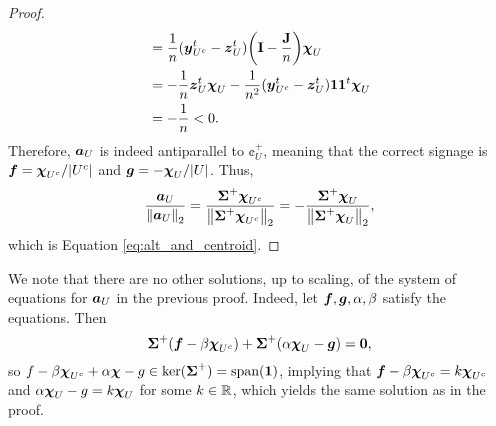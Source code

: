 \begin{proof}
\begin{align*}
&= \frac{1}{n}(\vb*{y}_{U^c}^t-\vb*{z}_U^t)\bigg(\vb{I}-\frac{\vb{J}}{n}\bigg)\boldsymbol{\chi}_U\\ &=-\frac{1}{n}\vb*{z}_U^t\boldsymbol{\chi}_U  - \frac{1}{n^2}(\vb*{y}_{U^c}^t-\vb*{z}_U^t)\vb{1}\vb{1}^t\boldsymbol{\chi}_U\\
&= -\frac{1}{n}<0.
\end{align*}
Therefore, $\vb*{a}_U$ is indeed antiparallel to $\cent^+_U$, meaning that the correct signage is $\vb*{f}=\boldsymbol{\chi}_{U^c}/|U^c|$ and $\vb*{g}=-\boldsymbol{\chi}_U/|U|$. Thus, 
\begin{equation*}
\frac{\vb*{a}_U}{\norm{\vb*{a}_U}_2}=\frac{\boldsymbol{\Sigma}^+\boldsymbol{\chi}_{U^c}}{\norm{ \boldsymbol{\Sigma}^+\boldsymbol{\chi}_{U^c}}_2}=-\frac{\boldsymbol{\Sigma}^+\boldsymbol{\chi}_{U}}{\norm{\boldsymbol{\Sigma}^+\boldsymbol{\chi}_U}_2},
\end{equation*}
which is Equation \eqref{eq:alt_and_centroid}. 
\end{proof}

\begin{remark}
	We note that there are no other solutions, up to scaling, of the system of equations for $\vb*{a}_U$ in the previous proof. Indeed, let $\vb*{f},\vb*{g},\alpha,\beta$ satisfy the equations. 
	Then 
	\[\boldsymbol{\Sigma}^+(\vb*{f}-\beta\boldsymbol{\chi}_{U^c}) + \boldsymbol{\Sigma}^+(\alpha\boldsymbol{\chi}_U-\vb*{g})=\vb{0}, \]
	so $f-\beta\boldsymbol{\chi}_{U^c} + \alpha\boldsymbol{\chi} -g\in \ker(\boldsymbol{\Sigma}^+) = \textnormal{span}(\vb{1})$, implying that $\vb*{f}-\beta\boldsymbol{\chi}_{U^c} = k\boldsymbol{\chi}_{U^c}$ and $\alpha\boldsymbol{\chi}_U -g=k\boldsymbol{\chi}_{U}$ for some $k\in \mathbb{R}$, which yields the same solution as in the proof. 
\end{remark}

